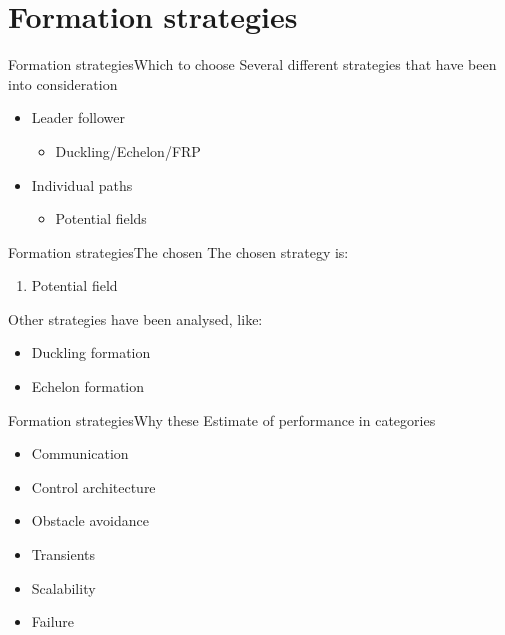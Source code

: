 \documentclass[10pt,handout]{beamer}
\begin{document}
\section{Formation strategies}

\begin{frame}{Formation strategies}{Which to choose}
Several different strategies that have been into consideration
  \begin{itemize}
    \item Leader follower
    \begin{itemize}
      \item Duckling/Echelon/FRP
    \end{itemize}
    \item Individual paths
    \begin{itemize}
      \item Potential fields
    \end{itemize}
   \end{itemize}
\end{frame}

\begin{frame}{Formation strategies}{The chosen}
The chosen strategy is:
\begin{enumerate}
  \item Potential field
\end{enumerate}
Other strategies have been analysed, like:
\begin{itemize}
\item Duckling formation
\item Echelon formation
\end{itemize}
\end{frame}

\begin{frame}{Formation strategies}{Why these}
Estimate of performance in categories
\begin{itemize}
  \item Communication
  \item Control architecture
  \item Obstacle avoidance
  \item Transients
  \item Scalability
  \item Failure
\end{itemize}
\end{frame}
\end{document}
